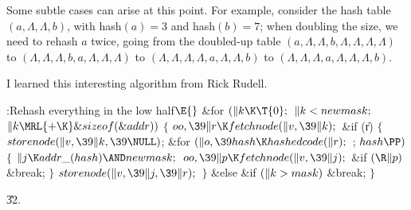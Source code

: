 Some subtle cases can arise at this point.
For example, consider the hash table
{\let\\=\Lambda $(a,\\,\\,b)$, with hash$(a)=3$ and hash$(b)=7$; when
doubling the size, we need to rehash $a$ twice, going from
the doubled-up table
$(a,\\,\\,b,\\,\\,\\,\\)$ to
$(\\,\\,\\,b,a,\\,\\,\\)$ to
$(\\,\\,\\,\\,a,\\,\\,b)$ to
$(\\,\\,\\,a,\\,\\,\\,b)$.}

I learned this interesting algorithm from Rick Rudell.

\Y\B\4:Rehash everything in the low half\X${}\E{}$\6
\&{for} ${}(\|k\K\T{0};{}$ ${}\|k<\\{newmask};{}$ ${}\|k\MRL{+{\K}}\&{sizeof}(%
\&{addr})){}$\5
${}\{{}$\1\6
${}\\{oo},\39\|r\K\\{fetchnode}(\|v,\39\|k);{}$\6
\&{if} (\|r)\5
${}\{{}$\1\6
${}\\{storenode}(\|v,\39\|k,\39\NULL){}$;\6
\&{for} ${}(\|o,\39\\{hash}\K\\{hashedcode}(\|r);{}$  ; ${}\\{hash}\PP){}$\5
${}\{{}$\1\6
${}\|j\K\\{addr\_}(\\{hash})\AND\\{newmask};{}$\6
${}\\{oo},\39\|p\K\\{fetchnode}(\|v,\39\|j);{}$\6
\&{if} ${}(\R\|p){}$\1\5
\&{break};\2\6
\4${}\}{}$\2\6
${}\\{storenode}(\|v,\39\|j,\39\|r);{}$\6
\4${}\}{}$\5
\2\&{else} \&{if} ${}(\|k>\\{mask}){}$\1\5
\&{break};\2\6
\4${}\}{}$\2\par
\U32.\fi


